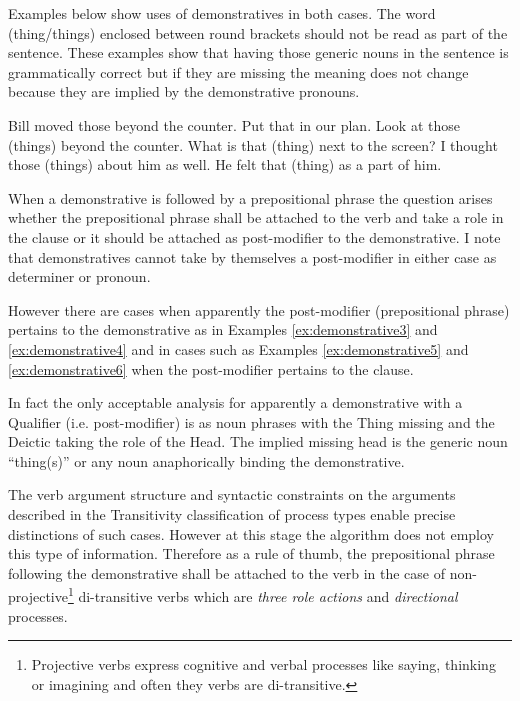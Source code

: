     Examples below show uses of demonstratives in both cases. The word (thing/things) enclosed between round brackets should not be read as part of the sentence. These examples show that having those generic nouns in the sentence is grammatically correct but if they are missing the meaning does not change because they are implied by the demonstrative pronouns.

    \begin{exe}
        \ex\label{ex:demonstrative1} Bill moved those beyond the counter.
        \ex\label{ex:demonstrative2} Put that in our plan.
        \ex\label{ex:demonstrative3} Look at those (things) beyond the counter.
        \ex\label{ex:demonstrative4} What is that (thing) next to the screen?
        \ex\label{ex:demonstrative5} I thought those (things) about him as well.
        \ex\label{ex:demonstrative6} He felt that (thing) as a part of him. 
    \end{exe}

    When a demonstrative is followed by a prepositional phrase the question arises whether the prepositional phrase shall be attached to the verb and take a role in the clause or it should be attached as post-modifier to the demonstrative. I note that demonstratives cannot take by themselves a post-modifier in either case as determiner or pronoun. 

    However there are cases when apparently the post-modifier (prepositional phrase) pertains to the demonstrative as in Examples \ref{ex:demonstrative3} and \ref{ex:demonstrative4} and in cases such as Examples \ref{ex:demonstrative5} and \ref{ex:demonstrative6} when the post-modifier pertains to the clause. 

    In fact the only acceptable analysis for apparently a demonstrative with a Qualifier (i.e. post-modifier) is as noun phrases with the Thing missing and the Deictic taking the role of the Head. The implied missing head is the generic noun ``thing(s)'' or any noun anaphorically binding the demonstrative.

    The verb argument structure and syntactic constraints on the arguments described in the Transitivity classification of process types enable precise distinctions of such cases. However at this stage the algorithm does not employ this type of information. Therefore as a rule of thumb, the prepositional phrase following the demonstrative shall be attached to the verb in the case of non-projective\footnote{Projective verbs express cognitive and verbal processes like saying, thinking or imagining and often they verbs are di-transitive.} di-transitive verbs which are \textit{three role actions} and \textit{directional} processes.

